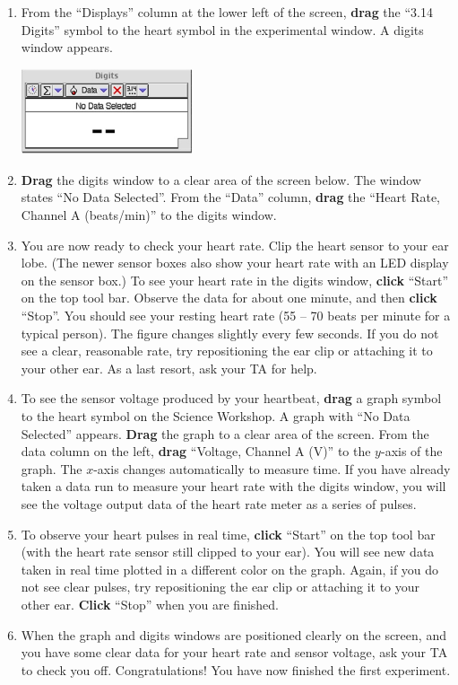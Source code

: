 \begin{enumerate}[label=\arabic*.]
\item From the ``Displays'' column at the lower left of the screen, \textbf{drag} the ``3.14 Digits'' symbol to the heart symbol in the experimental window.  A digits window appears.
\begin{center} \includegraphics*[width=0.4\textwidth]{imgs/6labs/6Alab/6Aexp1/6A-Exp1_fig5.jpg} \end{center}

\item \textbf{Drag} the digits window to a clear area of the screen below.  The window states ``No Data Selected''.  From the ``Data'' column, \textbf{drag} the ``Heart Rate, Channel A (beats/min)'' to the digits window.

\item You are now ready to check your heart rate.  Clip the heart sensor to your ear lobe.  (The newer sensor boxes also show your heart rate with an LED display on the sensor box.)  To see your heart rate in the digits window, \textbf{click} ``Start'' on the top tool bar.  Observe the data for about one minute, and then \textbf{click} ``Stop''.  You should see your resting heart rate (55 -- 70 beats per minute for a typical person).  The figure changes slightly every few seconds.  If you do not see a clear, reasonable rate, try repositioning the ear clip or attaching it to your other ear.  As a last resort, ask your TA for help.

\item To see the sensor voltage produced by your heartbeat, \textbf{drag} a graph symbol to the heart symbol on the Science Workshop.  A graph with ``No Data Selected'' appears.  \textbf{Drag} the graph to a clear area of the screen.  From the data column on the left, \textbf{drag} ``Voltage, Channel A (V)'' to the \(y\)-axis of the graph.  The \(x\)-axis changes automatically to measure time.  If you have already taken a data run to measure your heart rate with the digits window, you will see the voltage output data of the heart rate meter as a series of pulses.

\item To observe your heart pulses in real time, \textbf{click} ``Start'' on the top tool bar (with the heart rate sensor still clipped to your ear).  You will see new data taken in real time plotted in a different color on the graph.  Again, if you do not see clear pulses, try repositioning the ear clip or attaching it to your other ear.  \textbf{Click} ``Stop'' when you are finished.

\item When the graph and digits windows are positioned clearly on the screen, and you have some clear data for your heart rate and sensor voltage, ask your TA to check you off.  Congratulations!  You have now finished the first experiment.

\end{enumerate}


